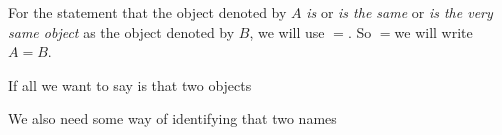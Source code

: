 For the statement that the object denoted by $A$ \textit{is} or \textit{is the same} or \textit{is the very same object} as the object denoted by $B$, we will use $=$.
So $=$we will write $A = B$.

If all we want to say is that two objects

We also need some way of identifying that two names


\begin{account}
\end{account}

\begin{account}
\end{account}

\begin{account}
\end{account}

\blankpage
